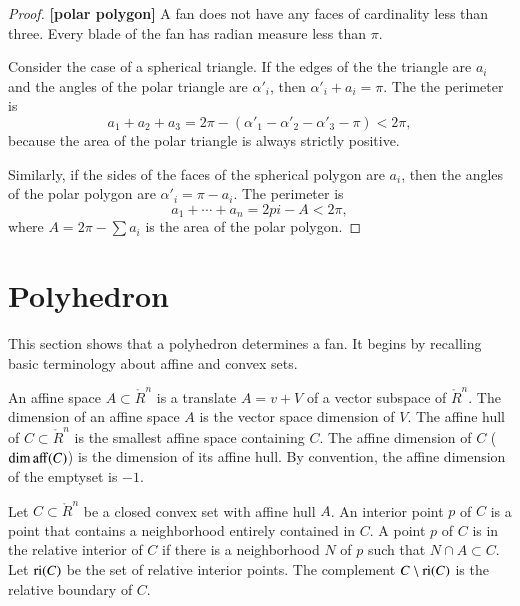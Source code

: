 \begin{proof} {\bf [polar polygon]} A fan does not have any faces of cardinality less than three.
Every blade of the fan has radian measure less than $\pi$.  

Consider the case of a spherical triangle.  If the edges of the
the triangle are $a_i$ and the angles of the polar
triangle are $\alpha'_i$, then $\alpha'_i+a_i=\pi$.
The the perimeter is 
$$a_1+a_2+a_3 = 2\pi - (\alpha'_1 -\alpha'_2 - \alpha'_3-\pi) < 2\pi,$$
because the area of the polar triangle is always strictly positive.

Similarly, if the sides of the faces of the spherical polygon are
$a_i$, then the angles of the polar polygon are $\alpha'_i = \pi-a_i$.
The perimeter is
$$
a_1+\cdots+a_n  = 2pi- A< 2\pi,
$$
where $A = 2\pi-\sum a_i$ is the area of the polar polygon.
\end{proof}



\section{Polyhedron}

This section shows that a polyhedron determines a fan.  It begins by recalling basic terminology about affine and convex sets.


An affine space $A\subset\ring{R}^n$ is a translate $A=v + V$ of
a vector subspace of $\ring{R}^n$.  The dimension of an affine space $A$
is the vector space dimension of $V$.  The
affine hull of $C\subset\ring{R}^n$ is the smallest affine space containing $C$.  The affine dimension of $C$ ($\operatorname{dim\,aff}(C)$) is the dimension of its affine hull.  By convention, the affine dimension of the emptyset is $-1$.

\begin{definition} Let $C\subset\ring{R}^n$ be a closed convex set with affine hull $A$.   An interior point $p$ of $C$ is a point that contains a neighborhood entirely contained in $C$.  A point $p$ of $C$ is in the relative interior of $C$ if there is a neighborhood $N$ of $p$ such that $N\cap A\subset C$.  Let ${\operatorname{ri}}(C)$ be the set of relative interior points.  The complement $C\setminus {\operatorname{ri}}(C)$ is the relative boundary of $C$.
\end{definition}

